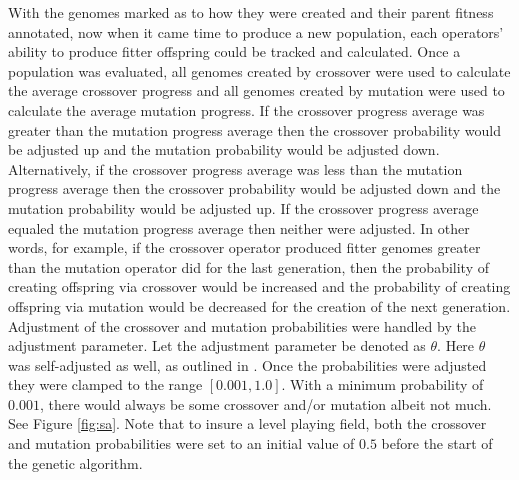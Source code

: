 \documentclass[a4paper,10pt]{article}
\begin{document}
With the genomes marked as to how they were created and their parent fitness annotated, now when it came time to produce a new population, each operators' ability to produce fitter offspring could be tracked and calculated. Once a population was evaluated, all genomes created by crossover were used to calculate the average crossover progress and all genomes created by mutation were used to calculate the average mutation progress. If the crossover progress average was greater than the mutation progress average then the crossover probability would be adjusted up and the mutation probability would be adjusted down. Alternatively, if the crossover progress average was less than the mutation progress average then the crossover probability would be adjusted down and the mutation probability would be adjusted up. If the crossover progress average equaled the mutation progress average then neither were adjusted. In other words, for example, if the crossover operator produced fitter genomes greater than the mutation operator did for the last generation, then the probability of creating offspring via crossover would be increased and the probability of creating offspring via mutation would be decreased for the creation of the next generation. Adjustment of the crossover and mutation probabilities were handled by the adjustment parameter. Let the adjustment parameter be denoted as $\theta$. Here $\theta$ was self-adjusted as well, as outlined in \cite{self_adapt}. Once the probabilities were adjusted they were clamped to the range $[0.001,1.0]$. With a minimum probability of $0.001$, there would always be some crossover and/or mutation albeit not much. See Figure \ref{fig:sa}. Note that to insure a level playing field, both the crossover and mutation probabilities were set to an initial value of $0.5$ before the start of the genetic algorithm.
\end{document}
